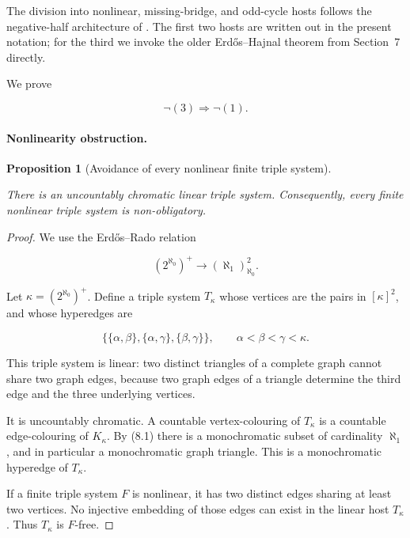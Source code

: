 \documentclass[a4paper,11pt,reqno]{amsart}
\theoremstyle{plain}
\newtheorem{proposition}[theorem]{Proposition}
\theoremstyle{definition}
\theoremstyle{remark}
\begin{document}
The division into nonlinear, missing-bridge, and odd-cycle hosts follows the
negative-half architecture of \citet[Sections~2--4]{li2026}.  The first two
hosts are written out in the present notation; for the third we invoke the
older Erdős--Hajnal theorem from Section~7 directly.

We prove

\[
\neg(3)\Longrightarrow\neg(1).
\]

\paragraph{Nonlinearity obstruction.}\label{nonlinearity-obstruction}

\begin{proposition}[Avoidance of every nonlinear finite triple system]\label{proposition-8.1-avoidance-of-every-nonlinear-finite-triple-system}

There is an uncountably chromatic linear triple system. Consequently, every finite nonlinear triple system is non-obligatory.

\end{proposition}
\begin{proof}
We use the Erd\H{o}s--Rado relation
\citep[Theorem~4(i), formula~(95), p.~471]{erdosrado1956}

\[
(2^{\aleph_0})^+\longrightarrow(\aleph_1)^2_{\aleph_0}. \tag{8.1}
\]

Let \(\kappa=(2^{\aleph_0})^+\). Define a triple system \(T_\kappa\) whose vertices are the pairs in \([\kappa]^2\), and whose hyperedges are

\[
\bigl\{
\{\alpha,\beta\},
\{\alpha,\gamma\},
\{\beta,\gamma\}
\bigr\},
\qquad \alpha<\beta<\gamma<\kappa.
\]

This triple system is linear: two distinct triangles of a complete graph cannot share two graph edges, because two graph edges of a triangle determine the third edge and the three underlying vertices.

It is uncountably chromatic. A countable vertex-colouring of \(T_\kappa\) is a countable edge-colouring of \(K_\kappa\). By (8.1) there is a monochromatic subset of cardinality \(\aleph_1\), and in particular a monochromatic graph triangle. This is a monochromatic hyperedge of \(T_\kappa\).

If a finite triple system \(F\) is nonlinear, it has two distinct edges sharing at least two vertices. No injective embedding of those edges can exist in the linear host \(T_\kappa\). Thus \(T_\kappa\) is \(F\)-free.
\end{proof}
\end{document}
